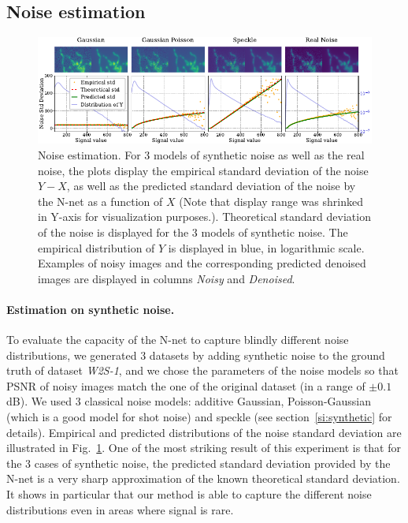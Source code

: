 \documentclass{article}
\begin{document}
\subsection{Noise estimation}

\begin{figure}[!htbp]
\vskip -0.1in
\begin{center}
\centerline{\includegraphics[width=\textwidth]{fig_noise_std_1col.pdf}}
\caption[Noise estimation]{Noise estimation.
For 3 models of synthetic noise as well as the real noise, the plots display the empirical standard deviation of the noise $Y - X$, as well as the predicted standard deviation of the noise by the N-net as a function of $X$ (Note that display range was shrinked in Y-axis for visualization purposes.).
Theoretical standard deviation of the noise is displayed for the 3 models of synthetic noise.
The empirical distribution of $Y$ is displayed in blue, in logarithmic scale.
Examples of noisy images and the corresponding predicted denoised images are displayed in columns \textit{Noisy} and \textit{Denoised}.}
\label{fig:noisestd}
\end{center}
\end{figure}
\paragraph{Estimation on synthetic noise.}
To evaluate the capacity of the N-net to capture blindly different noise distributions, we generated 3 datasets by adding synthetic noise to the ground truth of dataset \textit{W2S-1}, and we chose the parameters of the noise models so that PSNR of noisy images match the one of the original dataset (in a range of $\pm0.1$dB).
We used 3 classical noise models: additive Gaussian, Poisson-Gaussian (which is a good model for shot noise) and speckle (see section~\ref{si:synthetic} for details).
Empirical and predicted distributions of the noise standard deviation are illustrated in Fig.~\ref{fig:noisestd}.
One of the most striking result of this experiment is that for the 3 cases of synthetic noise, the predicted standard deviation provided by the N-net is a very sharp approximation of the known theoretical standard deviation.
It shows in particular that our method is able to capture the different noise distributions even in areas where signal is rare.
\end{document}
